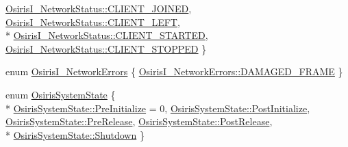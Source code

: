 \begin{DoxyCompactItemize}
\hyperlink{namespace_osiris_i_1_1_events_ab333d7f608a8f84b9c3fa0c1f7517e78a1468f10452f405c1faae6b5ce5306e00}{Osiris\-I\-\_\-\-Network\-Status\-::\-C\-L\-I\-E\-N\-T\-\_\-\-J\-O\-I\-N\-E\-D}, 
\hyperlink{namespace_osiris_i_1_1_events_ab333d7f608a8f84b9c3fa0c1f7517e78a8628ff850a0ffac857182e11025b7b02}{Osiris\-I\-\_\-\-Network\-Status\-::\-C\-L\-I\-E\-N\-T\-\_\-\-L\-E\-F\-T}, 
\\*
\hyperlink{namespace_osiris_i_1_1_events_ab333d7f608a8f84b9c3fa0c1f7517e78a434caa439f0c89b0ae539c61643766a7}{Osiris\-I\-\_\-\-Network\-Status\-::\-C\-L\-I\-E\-N\-T\-\_\-\-S\-T\-A\-R\-T\-E\-D}, 
\hyperlink{namespace_osiris_i_1_1_events_ab333d7f608a8f84b9c3fa0c1f7517e78a641a965b5c8211e14db75b67bc0311e0}{Osiris\-I\-\_\-\-Network\-Status\-::\-C\-L\-I\-E\-N\-T\-\_\-\-S\-T\-O\-P\-P\-E\-D}
 \}
\item 
enum \hyperlink{namespace_osiris_i_1_1_events_a9349e2e7af9d6c26d7ce997b34a12253}{Osiris\-I\-\_\-\-Network\-Errors} \{ \hyperlink{namespace_osiris_i_1_1_events_a9349e2e7af9d6c26d7ce997b34a12253a0428300937da118effaa07273a8945d1}{Osiris\-I\-\_\-\-Network\-Errors\-::\-D\-A\-M\-A\-G\-E\-D\-\_\-\-F\-R\-A\-M\-E}
 \}
\item 
enum \hyperlink{namespace_osiris_i_1_1_events_a045d02c48bfbfffe08648c8d38a983b4}{Osiris\-System\-State} \{ \\*
\hyperlink{namespace_osiris_i_1_1_events_a045d02c48bfbfffe08648c8d38a983b4af48e18df87e4d209ca1bb3b39af1b2e3}{Osiris\-System\-State\-::\-Pre\-Initialize} = 0, 
\hyperlink{namespace_osiris_i_1_1_events_a045d02c48bfbfffe08648c8d38a983b4ac1ed3434eeed79fa028807887e7c6722}{Osiris\-System\-State\-::\-Post\-Initialize}, 
\hyperlink{namespace_osiris_i_1_1_events_a045d02c48bfbfffe08648c8d38a983b4af603295e85b51a3b40a0e3d690446fc4}{Osiris\-System\-State\-::\-Pre\-Release}, 
\hyperlink{namespace_osiris_i_1_1_events_a045d02c48bfbfffe08648c8d38a983b4a15e707b81dda1598fd70a47fd039cb55}{Osiris\-System\-State\-::\-Post\-Release}, 
\\*
\hyperlink{namespace_osiris_i_1_1_events_a045d02c48bfbfffe08648c8d38a983b4a1a4ebb180ba59b067782515ffee6e975}{Osiris\-System\-State\-::\-Shutdown}
 \}
\end{DoxyCompactItemize}


